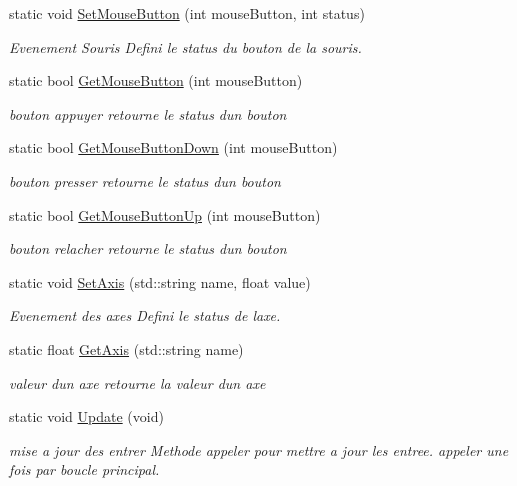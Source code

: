 \begin{DoxyCompactItemize}
static void \mbox{\hyperlink{class_beer_engine_1_1_input_a8761deb95726518ed5871a38aca6451d}{Set\+Mouse\+Button}} (int mouse\+Button, int status)
\begin{DoxyCompactList}\small\item\em Evenement Souris Defini le status du bouton de la souris. \end{DoxyCompactList}\item 
static bool \mbox{\hyperlink{class_beer_engine_1_1_input_a5f1cf046547a086a7f44d7c18ad6776d}{Get\+Mouse\+Button}} (int mouse\+Button)
\begin{DoxyCompactList}\small\item\em bouton appuyer retourne le status d\textquotesingle{}un bouton \end{DoxyCompactList}\item 
static bool \mbox{\hyperlink{class_beer_engine_1_1_input_ad04218c44ce0ef21ed6a5cf65259653f}{Get\+Mouse\+Button\+Down}} (int mouse\+Button)
\begin{DoxyCompactList}\small\item\em bouton presser retourne le status d\textquotesingle{}un bouton \end{DoxyCompactList}\item 
static bool \mbox{\hyperlink{class_beer_engine_1_1_input_a82dc5f380752307d5cb5b284488da5ef}{Get\+Mouse\+Button\+Up}} (int mouse\+Button)
\begin{DoxyCompactList}\small\item\em bouton relacher retourne le status d\textquotesingle{}un bouton \end{DoxyCompactList}\item 
static void \mbox{\hyperlink{class_beer_engine_1_1_input_af7f3c17ce4e2483d03a169894e06851d}{Set\+Axis}} (std\+::string name, float value)
\begin{DoxyCompactList}\small\item\em Evenement des axes Defini le status de l\textquotesingle{}axe. \end{DoxyCompactList}\item 
static float \mbox{\hyperlink{class_beer_engine_1_1_input_ac21c03c4b7d417941034e935af481f2c}{Get\+Axis}} (std\+::string name)
\begin{DoxyCompactList}\small\item\em valeur d\textquotesingle{}un axe retourne la valeur d\textquotesingle{}un axe \end{DoxyCompactList}\item 
static void \mbox{\hyperlink{class_beer_engine_1_1_input_a8a5a3a1a4b5fdedf20fc66c40d8e98bb}{Update}} (void)
\begin{DoxyCompactList}\small\item\em mise a jour des entrer Methode appeler pour mettre a jour les entree. appeler une fois par boucle principal. \end{DoxyCompactList}\end{DoxyCompactItemize}
